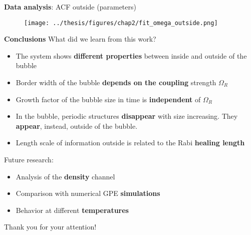 \documentclass[aspectratio=169]{beamer}
\newcommand{\backupbegin}{
    \newcounter{finalframe}
    \setcounter{finalframe}{\value{framenumber}}
}
\newcommand{\backupend}{
    \setcounter{framenumber}{\value{finalframe}}
}
\begin{document}
\begin{frame}{\textbf{Data analysis}: ACF outside (parameters)}
  \begin{figure}
      \centering
      \texttt{[image: ../thesis/figures/chap2/fit\_omega\_outside.png]}
  \end{figure}
\end{frame}

\begin{frame}{\textbf{Conclusions}}
  What did we learn from this work?
  \begin{itemize}
    \item The system shows \textbf{different properties} between inside and outside of the bubble
    \item Border width of the bubble \textbf{depends on the coupling} strength $\Omega_R$
    \item Growth factor of the bubble size in time is \textbf{independent} of $\Omega_R$
    \item In the bubble, periodic structures \textbf{disappear} with size increasing. They \textbf{appear}, instead, outside of the bubble.
    \item Length scale of information outside is related to the Rabi \textbf{healing length}
  \end{itemize}
  \pause
  Future research:
  \begin{itemize}
    \item Analysis of the \textbf{density} channel
    \item Comparison with numerical GPE \textbf{simulations}
    \item Behavior at different \textbf{temperatures}
  \end{itemize}
\end{frame}

\begin{frame}
  \huge
  Thank you for your attention!
\end{frame}

  
\end{document}

